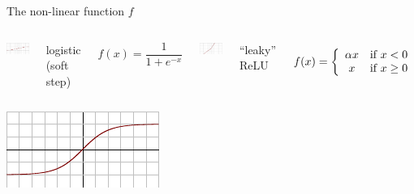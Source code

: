 \documentclass[aspectratio=169]{beamer}
\begin{document}
\begin{frame}{The non-linear function $f$}
\vspace{0.5cm}
\begin{columns}
\includegraphics[width=\linewidth]{Activation_logistic.pdf}

logistic (soft step)

\vspace{-\baselineskip}
\[ f(x) = \frac{1}{1 + e^{-x}} \]

\includegraphics[width=\linewidth]{Activation_prelu.pdf}


``leaky'' ReLU

\vspace{-\baselineskip}
\[ f(x) = \left\{ \begin{array}{c l}
\alpha x & \text{if } x < 0 \\
x & \text{if } x \ge 0 \\
\end{array} \right. \]
\end{columns}

\vspace{0.5cm}
\begin{columns}
\includegraphics[width=\linewidth]{Activation_tanh.pdf}


\end{columns}
\end{frame}
\end{document}
